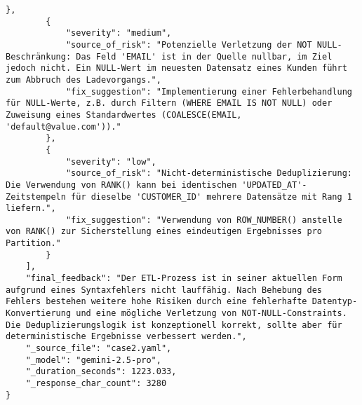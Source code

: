 \begin{lstlisting}[caption={Ausgabe: Gemini 2.5 Pro Anwendungsfall 2 Hauptdurchlauf},label={gemini_case2_prompt1}]
        },
        {
            "severity": "medium",
            "source_of_risk": "Potenzielle Verletzung der NOT NULL-Beschränkung: Das Feld 'EMAIL' ist in der Quelle nullbar, im Ziel jedoch nicht. Ein NULL-Wert im neuesten Datensatz eines Kunden führt zum Abbruch des Ladevorgangs.",
            "fix_suggestion": "Implementierung einer Fehlerbehandlung für NULL-Werte, z.B. durch Filtern (WHERE EMAIL IS NOT NULL) oder Zuweisung eines Standardwertes (COALESCE(EMAIL, 'default@value.com'))."
        },
        {
            "severity": "low",
            "source_of_risk": "Nicht-deterministische Deduplizierung: Die Verwendung von RANK() kann bei identischen 'UPDATED_AT'-Zeitstempeln für dieselbe 'CUSTOMER_ID' mehrere Datensätze mit Rang 1 liefern.",
            "fix_suggestion": "Verwendung von ROW_NUMBER() anstelle von RANK() zur Sicherstellung eines eindeutigen Ergebnisses pro Partition."
        }
    ],
    "final_feedback": "Der ETL-Prozess ist in seiner aktuellen Form aufgrund eines Syntaxfehlers nicht lauffähig. Nach Behebung des Fehlers bestehen weitere hohe Risiken durch eine fehlerhafte Datentyp-Konvertierung und eine mögliche Verletzung von NOT-NULL-Constraints. Die Deduplizierungslogik ist konzeptionell korrekt, sollte aber für deterministische Ergebnisse verbessert werden.",
    "_source_file": "case2.yaml",
    "_model": "gemini-2.5-pro",
    "_duration_seconds": 1223.033,
    "_response_char_count": 3280
}
\end{lstlisting}

